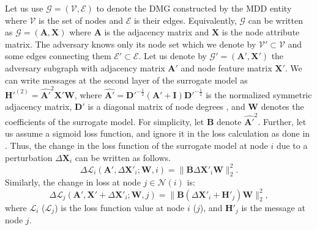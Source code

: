 \documentclass[conference,compsoc]{IEEEtran}
\begin{document}

\par Let us use $\mathcal{G}=(\mathcal{V},\mathcal{E})$ to denote the DMG constructed by the MDD entity where $\mathcal{V}$ is the set of nodes and $\mathcal{E}$ is their edges. Equivalently, $\mathcal{G}$ can be written as $\mathcal{G}=(\boldsymbol{A}, \boldsymbol{X})$ where $\boldsymbol{A}$ is the adjacency matrix and $\boldsymbol{X}$ is the node attribute matrix. The adversary knows only its node set which we denote by $\mathcal{V'} \subset \mathcal{V}$ and some edges connecting them $\mathcal{E'} \subset \mathcal{E}$. Let us denote by $\mathcal{G}'=(\boldsymbol{A'}, \boldsymbol{X'})$ the adversary subgraph with adjacency matrix $\boldsymbol{A'}$ and node feature matrix $\boldsymbol{X'}$. We can write messages at the second layer of the surrogate model as $\boldsymbol{H'}^{(2)}=\boldsymbol{\hat{A'}}^2 \boldsymbol{X'} \boldsymbol{W}$, where $\boldsymbol{\hat{A'}}=\boldsymbol{D'}^{-\frac{1}{2}}(\boldsymbol{A'}+\boldsymbol{I}) \boldsymbol{D'}^{-\frac{1}{2}}$ is the normalized symmetric adjacency matrix, $\boldsymbol{D'}$ is a diagonal matrix of node degrees \cite{kipf2016semi}, and $\boldsymbol{W}$ denotes the coefficients of the surrogate model. For simplicity, let $\boldsymbol{B}$ denote $\boldsymbol{\hat{A'}}^2$. Further, let us assume a sigmoid loss function, and ignore it in the loss calculation as done in \cite{zugner2018adversarial}. Thus, the change in the loss function of the surrogate model at node $i$ due to a perturbation $\Delta \boldsymbol{X}_i$ can be written as follows.
\begin{equation} \label{eq8}
\Delta \mathcal{L}_i\left(\boldsymbol{A'}, \Delta \boldsymbol{X'}_i ; \boldsymbol{W}, i\right)=
\|\boldsymbol{B} \Delta \boldsymbol{X'}_i \boldsymbol{W}\|_2^2.
\end{equation}
\noindent Similarly, the change in loss at node $j \in \mathcal{N}(i)$ is:
\begin{equation} \label{eq9}
\Delta \mathcal{L}_j\left(\boldsymbol{A'}, \boldsymbol{X'}+\Delta \boldsymbol{X'}_i; \boldsymbol{W}, j\right)=\|
\boldsymbol{B} (\Delta \boldsymbol{X'}_i+\boldsymbol{H'}_j) \boldsymbol{W}\|_2^2,
\end{equation}
\noindent where $\mathcal{L}_i$ ($\mathcal{L}_j$) is the loss function value at node $i$ ($j$), and $\boldsymbol{H'}_j$ is the message at node $j$.
\end{document}
